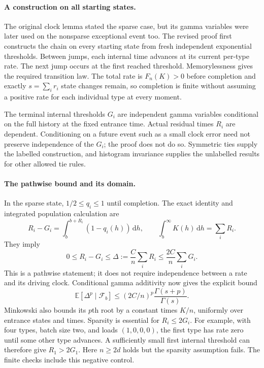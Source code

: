 \documentclass[11pt]{article}
\newcommand{\Ebb}{\mathbb E}
\begin{document}
\paragraph{A construction on all starting states.}
The original clock lemma stated the sparse case, but its gamma variables
were later used on the nonsparse exceptional event too. The revised proof
first constructs the chain on every starting state from fresh independent
exponential thresholds. Between jumps, each internal time advances at its
current per-type rate. The next jump occurs at the first reached threshold.
Memorylessness gives the required transition law. The total rate is
$F_n(K)>0$ before completion and exactly $s=\sum_i r_i$ state changes remain,
so completion is finite without assuming a positive rate for each individual
type at every moment.

The terminal internal thresholds $G_i$ are independent gamma variables
conditional on the full history at the fixed entrance time. Actual residual
times $R_i$ are dependent. Conditioning on a future event such as a small
clock error need not preserve independence of the $G_i$; the proof does not
do so. Symmetric ties supply the labelled construction, and histogram
invariance supplies the unlabelled results for other allowed tie rules.

\paragraph{The pathwise bound and its domain.}
In the sparse state, $1/2\le q_i\le1$ until completion. The exact identity
and integrated population calculation are
\[
 R_i-G_i=\int_b^{b+R_i}(1-q_i(h))\,\mathrm dh,
 \qquad \int_b^\infty K(h)\,\mathrm dh=\sum_i R_i.
\]
They imply
\[
 0\le R_i-G_i\le\Delta:=\frac Cn\sum_i R_i
 \le\frac{2C}{n}\sum_i G_i.
\]
This is a pathwise statement; it does not require independence between a
rate and its driving clock. Conditional gamma additivity now gives the
explicit bound
\[
 \Ebb[\Delta^p\mid\mathcal F_b]
 \le (2C/n)^p\frac{\Gamma(s+p)}{\Gamma(s)}.
\]
Minkowski also bounds its $p$th root by a constant times $K/n$, uniformly
over entrance states and times. Sparsity is essential for $R_i\le2G_i$.
For example, with four types, batch size two, and loads $(1,0,0,0)$, the
first type has rate zero until some other type advances. A sufficiently
small first internal threshold can therefore give $R_1>2G_1$. Here
$n\ge2d$ holds but the sparsity assumption fails. The finite checks include
this negative control.
\end{document}
